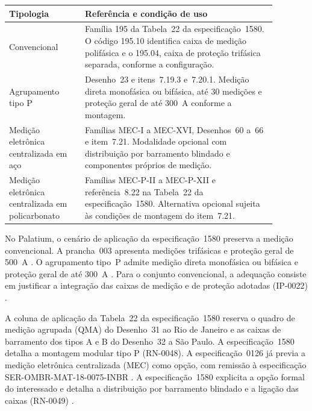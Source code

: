 \par\noindent
\begin{minipage}{\linewidth}
  \label{qua:tipologias-cm-ce}
  \vspace{0.7\baselineskip}
  \centering
  {\small
  \renewcommand{\arraystretch}{1.15}
  \setlength{\tabcolsep}{4pt}
  \begin{tabular}{|>{\raggedright\arraybackslash}p{0.25\linewidth}|>{\raggedright\arraybackslash}p{0.63\linewidth}|}
    \hline
    \textbf{Tipologia} & \textbf{Referência e condição de uso} \\\hline
    Convencional & Família 195 da Tabela~22 da especificação~1580. O código 195.10 identifica caixa de medição polifásica e o 195.04, caixa de proteção trifásica separada, conforme a configuração. \\\hline
    Agrupamento tipo P & Desenho~23 e itens~7.19.3 e~7.20.1. Medição direta monofásica ou bifásica, até 30 medições e proteção geral de até 300~A conforme a montagem. \\\hline
    Medição eletrônica centralizada em aço & Famílias MEC-I a MEC-XVI, Desenhos~60 a~66 e item~7.21. Modalidade opcional com distribuição por barramento blindado e componentes próprios de medição. \\\hline
    Medição eletrônica centralizada em policarbonato & Famílias MEC-P-II a MEC-P-XII e referência~8.22 na Tabela~22 da especificação~1580. Alternativa opcional sujeita às condições de montagem do item~7.21. \\\hline
  \end{tabular}
  }
\end{minipage}
\par

No Palatium, o cenário de aplicação da especificação~1580 preserva a medição convencional. A prancha~003 apresenta medições trifásicas e proteção geral de 500~A \cite[prancha~003]{palatiumpranchas2025}. O agrupamento tipo~P admite medição direta monofásica ou bifásica e proteção geral de até 300~A \cite[item~7.20.1]{enel1580}. Para o conjunto convencional, a adequação consiste em justificar a integração das caixas de medição e de proteção adotadas (IP-0022) \cite[tabela~22]{enel1580}\cite[tabela~8]{enel1569}.

A coluna de aplicação da Tabela~22 da especificação~1580 reserva o quadro de medição agrupada (QMA) do Desenho~31 ao Rio de Janeiro e as caixas de barramento dos tipos A e B do Desenho~32 a São Paulo. A especificação~1580 detalha a montagem modular tipo P (RN-0048). A especificação~0126 já previa a medição eletrônica centralizada (MEC) como opção, com remissão à especificação SER-OMBR-MAT-18-0075-INBR \cite[item~7.7.2]{enel0126}. A especificação~1580 explicita a opção formal do interessado e detalha a distribuição por barramento blindado e a ligação das caixas (RN-0049) \cite[tabela~22 e itens~7.20.1 e~7.21--7.21.2]{enel1580}.

